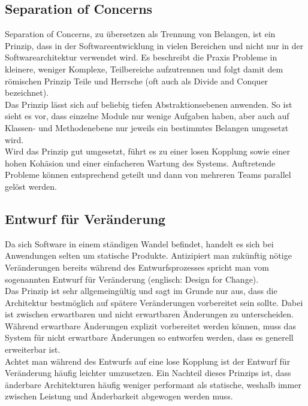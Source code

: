 \subsection{Separation of Concerns} %
\label{sub:Separation_of_Concerns}
Separation of Concerns, zu übersetzen als Trennung von Belangen, ist ein Prinzip, dass in der Softwareentwicklung in vielen Bereichen und nicht nur in der Softwarearchitektur verwendet wird.
Es beschreibt die Praxis Probleme in kleinere, weniger Komplexe, Teilbereiche aufzutrennen und folgt damit dem römischen Prinzip \glqq{}Teile und Herrsche\grqq{} (oft auch als \glqq{}Divide and Conquer\grqq{} bezeichnet).~\cite{softArchGrundl}\\

Das Prinzip lässt sich auf beliebig tiefen Abstraktionsebenen anwenden.
So ist sieht es vor, dass einzelne Module nur wenige Aufgaben haben, aber auch auf Klassen- und Methodenebene nur jeweils ein bestimmtes Belangen umgesetzt wird.~\cite{eilebrecht2018patterns}~\cite{softArchGrundl}\\

Wird das Prinzip gut umgesetzt, führt es zu einer losen Kopplung sowie einer hohen Kohäsion und einer einfacheren Wartung des Systems.
Auftretende Probleme können entsprechend geteilt und dann von mehreren Teams parallel gelöst werden.~\cite{softArchGrundl}

\subsection{Entwurf für Veränderung} %
\label{sub:Entwurf_für_Veraenderung}
Da sich Software in einem ständigen Wandel befindet, handelt es sich bei Anwendungen selten um statische Produkte.
Antizipiert man zukünftig nötige Veränderungen bereits während des Entwurfsprozesses spricht man vom sogenannten Entwurf für Veränderung (englisch: Design for Change).~\cite{softArchGrundl}\\
Das Prinzip ist sehr allgemeingültig und sagt im Grunde nur aus, dass die Architektur bestmöglich auf spätere Veränderungen vorbereitet sein sollte.
Dabei ist zwischen erwartbaren und nicht erwartbaren Änderungen zu unterscheiden.
Während erwartbare Änderungen explizit vorbereitet werden können, muss das System für nicht erwartbare Änderungen so entworfen werden, dass es generell erweiterbar ist.\\
Achtet man während des Entwurfs auf eine lose Kopplung ist der Entwurf für Veränderung häufig leichter umzusetzen.
Ein Nachteil dieses Prinzips ist, dass änderbare Architekturen häufig weniger performant als statische, weshalb immer zwischen Leistung und Änderbarkeit abgewogen werden muss.~\cite{softArchGrundl}

